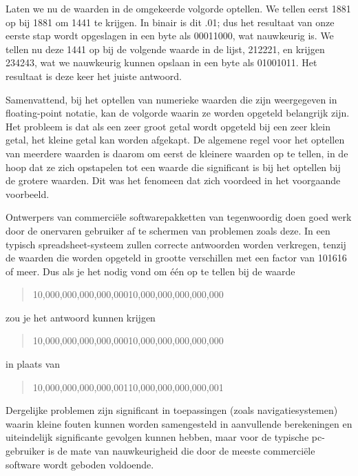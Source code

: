 Laten we nu de waarden in de omgekeerde volgorde optellen. We tellen eerst 1881​ op bij 1881​ om 1441​ te krijgen. In binair is dit .01; dus het resultaat van onze eerste stap wordt opgeslagen in een byte als 00011000, wat nauwkeurig is. We tellen nu deze 1441​ op bij de volgende waarde in de lijst, 212221​, en krijgen 234243​, wat we nauwkeurig kunnen opslaan in een byte als 01001011. Het resultaat is deze keer het juiste antwoord.

Samenvattend, bij het optellen van numerieke waarden die zijn weergegeven in floating-point notatie, kan de volgorde waarin ze worden opgeteld belangrijk zijn. Het probleem is dat als een zeer groot getal wordt opgeteld bij een zeer klein getal, het kleine getal kan worden afgekapt. De algemene regel voor het optellen van meerdere waarden is daarom om eerst de kleinere waarden op te tellen, in de hoop dat ze zich opstapelen tot een waarde die significant is bij het optellen bij de grotere waarden. Dit was het fenomeen dat zich voordeed in het voorgaande voorbeeld.

Ontwerpers van commerciële softwarepakketten van tegenwoordig doen goed werk door de onervaren gebruiker af te schermen van problemen zoals deze. In een typisch spreadsheet-systeem zullen correcte antwoorden worden verkregen, tenzij de waarden die worden opgeteld in grootte verschillen met een factor van 101616 of meer. Dus als je het nodig vond om één op te tellen bij de waarde
\begin{quote}
10,000,000,000,000,00010,000,000,000,000,000
\end{quote}
zou je het antwoord kunnen krijgen
\begin{quote}
10,000,000,000,000,00010,000,000,000,000,000
\end{quote}
in plaats van
\begin{quote}
10,000,000,000,000,00110,000,000,000,000,001
\end{quote}
%
Dergelijke problemen zijn significant in toepassingen (zoals navigatiesystemen) waarin kleine fouten kunnen worden samengesteld in aanvullende berekeningen en uiteindelijk significante gevolgen kunnen hebben, maar voor de typische pc-gebruiker is de mate van nauwkeurigheid die door de meeste commerciële software wordt geboden voldoende.


